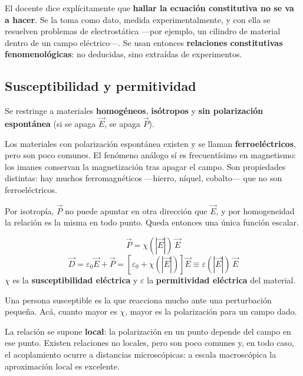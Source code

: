 \documentclass[12pt,a4paper]{article}
\begin{document}
\begin{warnbox}
El docente dice explícitamente que \textbf{hallar la ecuación constitutiva no se
va a hacer}. Se la toma como dato, medida experimentalmente, y con ella se
resuelven problemas de electrostática ---por ejemplo, un cilindro de material
dentro de un campo eléctrico---. Se usan entonces \textbf{relaciones
constitutivas fenomenológicas}: no deducidas, sino extraídas de experimentos.
\end{warnbox}

\subsection{Susceptibilidad y permitividad}

Se restringe a materiales \textbf{homogéneos}, \textbf{isótropos} y \textbf{sin
polarización espontánea} (si se apaga $\vec E$, se apaga $\vec P$).

\begin{notebox}
Los materiales con polarización espontánea existen y se llaman
\textbf{ferroeléctricos}, pero son poco comunes. El fenómeno análogo sí es
frecuentísimo en magnetismo: los imanes conservan la magnetización tras apagar el
campo. Son propiedades distintas: hay muchos ferromagnéticos ---hierro, níquel,
cobalto--- que no son ferroeléctricos.
\end{notebox}

Por isotropía, $\vec P$ no puede apuntar en otra dirección que $\vec E$, y por
homogeneidad la relación es la misma en todo punto. Queda entonces una única
función escalar.

\begin{keybox}
\[
\boxed{\ \vec P = \chi(|\vec E|)\, \vec E \ }
\]
\[
\vec D = \varepsilon_0 \vec E + \vec P
= \left[\varepsilon_0 + \chi(|\vec E|)\right] \vec E
\equiv \varepsilon(|\vec E|)\, \vec E
\]
$\chi$ es la \textbf{susceptibilidad eléctrica} y $\varepsilon$ la
\textbf{permitividad eléctrica} del material.
\end{keybox}

\begin{notebox}
Una persona susceptible es la que reacciona mucho ante una perturbación pequeña.
Acá, cuanto mayor es $\chi$, mayor es la polarización para un campo dado.
\end{notebox}

La relación se supone \textbf{local}: la polarización en un punto depende del
campo en ese punto. Existen relaciones no locales, pero son poco comunes y, en
todo caso, el acoplamiento ocurre a distancias microscópicas: a escala
macroscópica la aproximación local es excelente.
\end{document}
